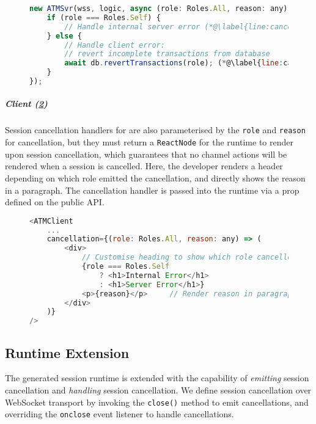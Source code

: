 \begin{figure}[!h]
\begin{lstlisting}[language=javascript]
new ATMSvr(wss, logic, async (role: Roles.All, reason: any) => {
	if (role === Roles.Self) {
		// Handle internal server error	(*@\label{line:cancelsvrinternal}@*)
	} else {
		// Handle client error:
		// revert incomplete transactions from database
		await db.revertTransactions(role); (*@\label{line:cancelsvrexternal}@*)
	}
});
\end{lstlisting}
\label{lst:cancelsvr}
\end{figure}

\subparagraph{Client (\cref{lst:cancelclient})}
Session cancellation handlers for 
are also parameterised by the \texttt{role} and \texttt{reason} for
cancellation, but they must return a \texttt{ReactNode}
for the runtime to render upon session cancellation, which
guarantees that no channel actions will be rendered when a session
is cancelled. Here, the developer renders a header depending
on which role emitted the cancellation, and directly shows
the reason in a paragraph. 
The cancellation handler is passed into the runtime via a 
prop defined on the public API.

\begin{figure}[!h]
\begin{lstlisting}[language=javascript]
<ATMClient
	...
	cancellation={(role: Roles.All, reason: any) => (
		<div>
			// Customise heading to show which role cancelled
			{role === Roles.Self
				? <h1>Internal Error</h1>
				: <h1>Server Error</h1>}
			<p>{reason}</p>		// Render reason in paragraph
		</div>
	)}	
/>
\end{lstlisting}
\label{lst:cancelclient}
\end{figure}

\subsection{Runtime Extension}
\label{subsection:errorruntime}

The generated session runtime is extended
with the capability of \textit{emitting} session
cancellation and \textit{handling} session cancellation.
We define session cancellation over WebSocket transport
by invoking the \texttt{close()} method to emit cancellations,
and overriding the \texttt{onclose} event listener to handle
cancellations. 

